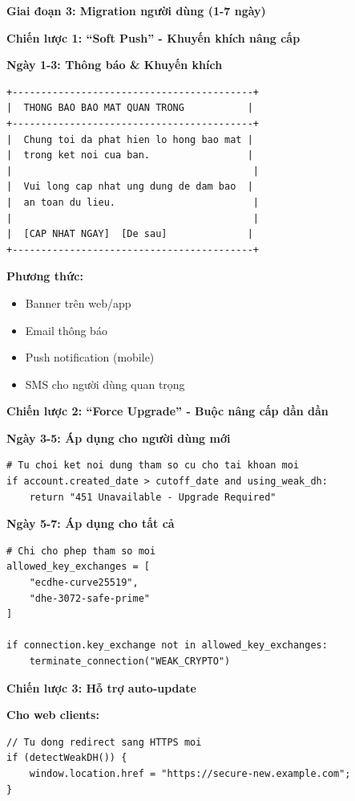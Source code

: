 \textbf{Giai đoạn 3: Migration người dùng (1-7 ngày)}

\textbf{Chiến lược 1: ``Soft Push'' - Khuyến khích nâng cấp}

\textbf{Ngày 1-3: Thông báo \& Khuyến khích}

\begin{verbatim}
+------------------------------------------+
|  THONG BAO BAO MAT QUAN TRONG           |
+------------------------------------------+
|  Chung toi da phat hien lo hong bao mat |
|  trong ket noi cua ban.                 |
|                                          |
|  Vui long cap nhat ung dung de dam bao  |
|  an toan du lieu.                        |
|                                          |
|  [CAP NHAT NGAY]  [De sau]              |
+------------------------------------------+
\end{verbatim}

\textbf{Phương thức:}
\begin{itemize}
    \item Banner trên web/app
    \item Email thông báo
    \item Push notification (mobile)
    \item SMS cho người dùng quan trọng
\end{itemize}

\textbf{Chiến lược 2: ``Force Upgrade'' - Buộc nâng cấp dần dần}

\textbf{Ngày 3-5: Áp dụng cho người dùng mới}

\begin{verbatim}
# Tu choi ket noi dung tham so cu cho tai khoan moi
if account.created_date > cutoff_date and using_weak_dh:
    return "451 Unavailable - Upgrade Required"
\end{verbatim}

\textbf{Ngày 5-7: Áp dụng cho tất cả}

\begin{verbatim}
# Chi cho phep tham so moi
allowed_key_exchanges = [
    "ecdhe-curve25519",
    "dhe-3072-safe-prime"
]

if connection.key_exchange not in allowed_key_exchanges:
    terminate_connection("WEAK_CRYPTO")
\end{verbatim}

\textbf{Chiến lược 3: Hỗ trợ auto-update}

\textbf{Cho web clients:}

\begin{verbatim}
// Tu dong redirect sang HTTPS moi
if (detectWeakDH()) {
    window.location.href = "https://secure-new.example.com";
}
\end{verbatim}

